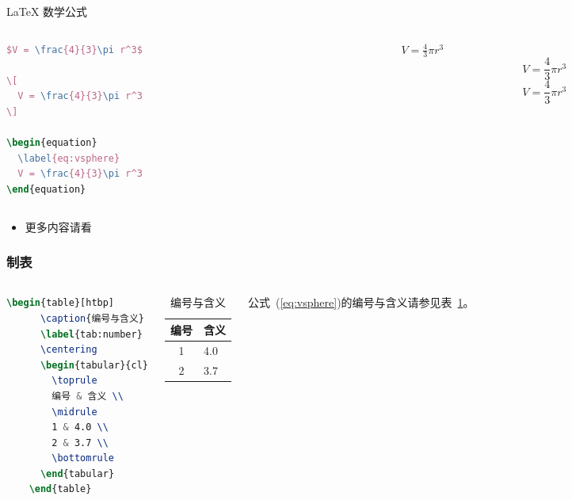 \documentclass{beamer}
\begin{document}
\begin{frame}[fragile]{\LaTeX{} 数学公式}
    \begin{columns}
        \begin{column}{.55\textwidth}
\begin{lstlisting}[language=TeX]
$V = \frac{4}{3}\pi r^3$

\[
  V = \frac{4}{3}\pi r^3
\]

\begin{equation}
  \label{eq:vsphere}
  V = \frac{4}{3}\pi r^3
\end{equation}
\end{lstlisting}
        \end{column}
        \begin{column}{.4\textwidth}
            $V = \frac{4}{3}\pi r^3$
            \[
                V = \frac{4}{3}\pi r^3
            \]
            \begin{equation}
                \label{eq:vsphere}
                V = \frac{4}{3}\pi r^3
            \end{equation}
        \end{column}
    \end{columns}
    \begin{itemize}
        \item 更多内容请看 \href{https://zh.wikipedia.org/wiki/Help:数学公式}{\color{bnu}{这里}}
    \end{itemize}
\end{frame}

\begin{frame}[fragile]
    \frametitle{制表}
    \begin{columns}
\begin{lstlisting}[language=TeX]
    \begin{table}[htbp]
      \caption{编号与含义}
      \label{tab:number}
      \centering
      \begin{tabular}{cl}
        \toprule
        编号 & 含义 \\
        \midrule
        1 & 4.0 \\
        2 & 3.7 \\
        \bottomrule
      \end{tabular}
    \end{table}
\end{lstlisting}
        \begin{table}[htpb]
            \centering
            \caption{编号与含义}
            \label{tab:number}
            \begin{tabular}{cl}\toprule
                编号 & 含义 \\\midrule
                1 & 4.0\\
                2 & 3.7\\\bottomrule
            \end{tabular}
        \end{table}
        \normalsize 公式~(\ref{eq:vsphere})的编号与含义请参见表~\ref{tab:number}。
    \end{columns}
\end{frame}
\end{document}
